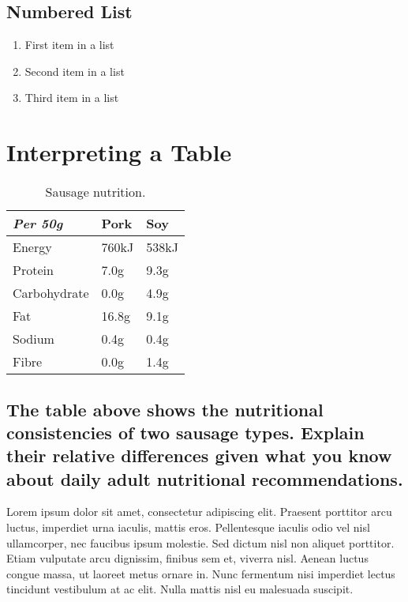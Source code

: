 \documentclass[11pt]{scrartcl} %
\begin{document}

\subsection{Numbered List}

\begin{enumerate}
	\item First item in a list 
	\item Second item in a list 
	\item Third item in a list
\end{enumerate}


\section{Interpreting a Table}

\begin{table}[h] %
	\centering %
	\begin{tabular}{l l l}
		\toprule
		\textit{Per 50g} & \textbf{Pork} & \textbf{Soy} \\
		\midrule
		Energy & 760kJ & 538kJ\\
		Protein & 7.0g & 9.3g\\
		Carbohydrate & 0.0g & 4.9g\\
		Fat & 16.8g & 9.1g\\
		Sodium & 0.4g & 0.4g\\
		Fibre & 0.0g & 1.4g\\
		\bottomrule
	\end{tabular}
	\caption{Sausage nutrition.}
\end{table}


\subsection{The table above shows the nutritional consistencies of two sausage types. Explain their relative differences given what you know about daily adult nutritional recommendations.}

Lorem ipsum dolor sit amet, consectetur adipiscing elit. Praesent porttitor arcu luctus, imperdiet urna iaculis, mattis eros. Pellentesque iaculis odio vel nisl ullamcorper, nec faucibus ipsum molestie. Sed dictum nisl non aliquet porttitor. Etiam vulputate arcu dignissim, finibus sem et, viverra nisl. Aenean luctus congue massa, ut laoreet metus ornare in. Nunc fermentum nisi imperdiet lectus tincidunt vestibulum at ac elit. Nulla mattis nisl eu malesuada suscipit.
\end{document}
